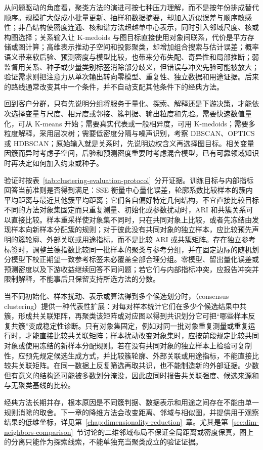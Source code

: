 从问题驱动的角度看，聚类方法的演进可按七种压力理解，而不是按年份排成替代顺序。规模扩大促成小批量更新、抽样和数据摘要，却加入近似误差与顺序敏感性；非凸结构使密度连通、核和谱方法超越单中心表示，同时引入邻域尺度、核或构图选择；关系输入让 K-medoids 与图目标直接使用对象间联系，代价是平方存储或图计算；高维表示推动子空间和投影聚类，却增加组合搜索与估计误差；概率语义带来软后验、预测密度与模型比较，也带来分布失配、奇异性和局部推断；弱监督用关系、种子或少量类别标签消除部分歧义，但错误与冲突先验可能被放大；验证需求则把注意力从单次输出转向零模型、重复性、独立数据和用途证据。后来的路线通常改变其中一个条件，并不自动支配其他条件下的经典方法。

回到客户分群，只有先说明分组将服务于量化、探索、解释还是下游决策，才能依次选择变量与尺度、相异度或邻接、簇判据、输出粒度和先验。需要快速数值量化，可从 K-means 开始；需要真实代表或一般相异度，可用 K-medoids；需要多粒度解释，采用层次树；需要低密度分隔与噪声识别，考察 DBSCAN、OPTICS 或 HDBSCAN；原始输入就是关系时，先说明边权含义再选择图目标。相关变量因簇而异时考虑子空间，后验和预测密度重要时考虑混合模型，已有可靠领域知识时再决定如何加入约束或种子。

验证时按表~\ref{tab:clustering-evaluation-protocol}~分开证据。训练目标与内部指标回答当前准则是否得到满足：SSE 衡量中心量化误差，轮廓系数比较样本的簇内平均距离与最近其他簇平均距离；它们各自偏好特定几何结构，不宜直接比较目标不同的方法对象集固定而只重复测量、初始化或参数扰动时，ARI 和共簇关系可以直接比较。样本重采样使对象集不同时，只在共同对象上比较，或者先冻结由发现样本向新样本分配簇的规则；对于彼此没有共同对象的独立样本，应比较预先声明的簇轮廓、外部关联或用途指标，而不是比较 ARI 或共簇矩阵。存在独立参考标签时，调整兰德指数比较同一批样本的聚类与参考分组，并在固定边际的随机划分模型下校正期望一致参考标签未必覆盖全部合理分组。零模型、留出量化误差或预测密度以及下游收益继续回答不同问题；若它们与内部指标冲突，应报告冲突并限制解释，不能事后只保留支持所选方法的分数。

当不同初始化、样本扰动、表示或算法得到多个候选划分时，（consensus clustering）提供一种代表性扩展：对每对样本统计它们在多少个候选结果中共簇，形成共关联矩阵，再聚类该矩阵或对应图以得到共识划分它可把“哪些样本反复共簇”变成稳定性诊断。只有对象集固定，例如对同一批对象重复测量或重复运行时，才能直接比较共关联矩阵；样本扰动改变对象集时，应按前段规定比较共同对象或使用冻结的新样本分配规则。若在没有共同对象的独立样本上检验可复制性，应预先规定候选生成方式，并比较簇轮廓、外部关联或用途指标，不能直接比较共关联矩阵。在同一数据上反复筛选再取共识，也不能制造新的外部证据。少数但有意义的结构还可能被多数划分淹没，因此应同时报告共关联强度、候选来源和与无聚类基线的比较。

经典方法长期并存，根本原因是不同簇判据、数据表示和用途之间存在不能由单一规则消除的取舍。下一章的降维方法会改变距离、邻域与相似图，并提供用于观察结果的低维坐标，详见第~\ref{chap:dimensionality-reduction}~章。尤其是第~\ref{sec:dim-neighbors-comparison}~节讨论的二维邻域布局不保证全局距离或密度保真，图上的分离只能作为探索线索，不能单独充当聚类成立的验证证据。
